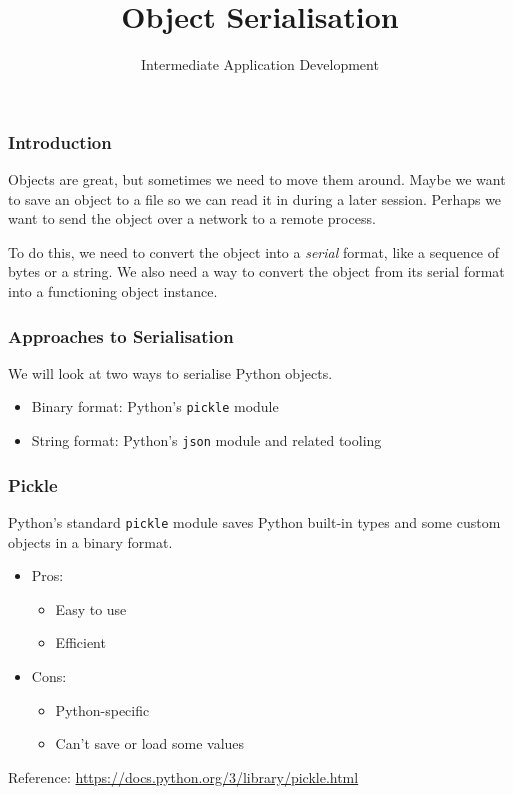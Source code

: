 \documentclass[10pt]{beamer}
\title{Object Serialisation}
\author[IN608]{Intermediate Application Development}
\institute[Otago Polytechnic]{
  Otago Polytechnic \\
  Dunedin, New Zealand \\
  Kaiako: Tom Clark
}
\date{}
\begin{document}
\begin{frame}[plain]
  \titlepage
\end{frame}

\begin{frame}
  \frametitle{Introduction}
  
  Objects are great, but sometimes we need to move them around. Maybe we 
  want to save an object to a file so we can read it in during a later session.
  Perhaps we want to send the object over a network to a remote process. 
  
  \vspace{5mm}
  To do this, we need to convert the object into a \emph{serial} format,
  like a sequence of bytes or a string. We also need a way to convert the object from 
  its serial format into a functioning object instance.
\end{frame}

\begin{frame}
  \frametitle{Approaches to Serialisation}
  
  We will look at two ways to serialise Python objects.
  
  \begin{itemize}
    \item Binary format: Python's \texttt{pickle} module
    \item String format: Python's \texttt{json} module and related tooling
  \end{itemize}
    
  \end{frame}

\begin{frame}
  \frametitle{Pickle}
  
  Python's standard \texttt{pickle} module saves Python built-in types and
  some custom objects in a binary format.
  
  \begin{itemize}
    \item Pros:
      \begin{itemize}
        \item Easy to use
        \item Efficient
      \end{itemize}  
    \item Cons:
      \begin{itemize}
        \item Python-specific
        \item Can't save or load some values 
      \end{itemize}  
  \end{itemize}
  
  Reference: \url{https://docs.python.org/3/library/pickle.html}
    
  \end{frame}
\end{document}
